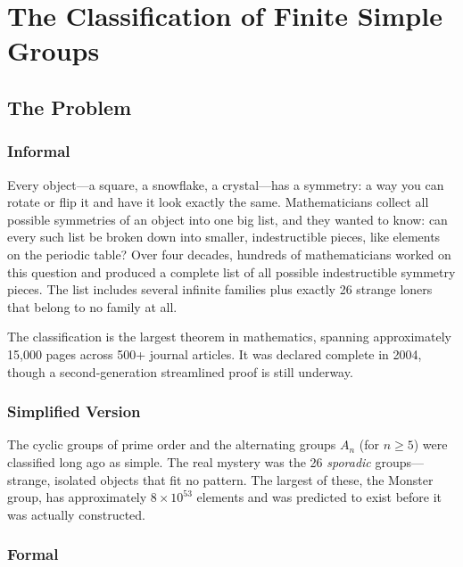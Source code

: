 \let\LocalMacro\relax

\chapter{The Classification of Finite Simple Groups}

\section{The Problem}

\subsection{Informal}
Every object---a square, a snowflake, a crystal---has a symmetry: a way you can rotate or flip it and have it look exactly the same. Mathematicians collect all possible symmetries of an object into one big list, and they wanted to know: can every such list be broken down into smaller, indestructible pieces, like elements on the periodic table? Over four decades, hundreds of mathematicians worked on this question and produced a complete list of all possible indestructible symmetry pieces. The list includes several infinite families plus exactly 26 strange loners that belong to no family at all.

\begin{historicalbox}
The classification is the largest theorem in mathematics, spanning approximately 15,000 pages across 500+ journal articles. It was declared complete in 2004, though a second-generation streamlined proof is still underway.
\end{historicalbox}

\subsection{Simplified Version}
The cyclic groups of prime order and the alternating groups $A_n$ (for $n \ge 5$) were classified long ago as simple. The real mystery was the 26 \emph{sporadic} groups---strange, isolated objects that fit no pattern. The largest of these, the Monster group, has approximately $8 \times 10^{53}$ elements and was predicted to exist before it was actually constructed.

\subsection{Formal}

